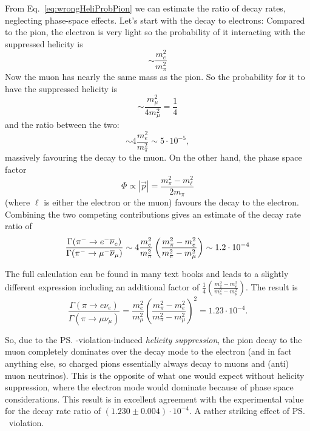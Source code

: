  From Eq.~\ref{eq:wrongHeliProbPion} we can estimate the ratio of
 decay rates, neglecting phase-space effects. Let's start with the
 decay to electrons: Compared to the pion, the electron is very 
 light so the probability of it interacting with the suppressed
 helicity is
\begin{equation}
 \sim \frac{m_e^2}{m_{\pi}^2}
\end{equation}
 Now the muon has nearly the same mass as the pion. So
 the probability for it to have the suppressed helicity is
\begin{equation}
 \sim \frac{m_{\mu}^2}{4 m_{\mu}^2} = \frac{1}{4}
\end{equation}
 and the ratio between the two:
\begin{equation}
 \sim 4\frac{m_e^2}{m_{\pi}^2} \sim 5\cdot 10^{-5},
\end{equation}
 massively favouring the decay to the muon.
 On the other hand, the phase space factor
 \begin{equation}
 \Phi \propto |\vec{p}| = 
 \frac{m^2_{\pi} - m^2_{\ell}}{2 m_{\pi}}
 \end{equation}
(where $\ell$ is either the electron or the muon) favours the decay to the electron. Combining the two competing contributions gives an estimate of the decay rate ratio of
 \begin{equation}
 \frac{\Gamma({\rm \pi^-} \to e^- \overline{\nu}_e)}{
    \Gamma({\rm \pi^-} \to \mu^- \overline{\nu}_{\mu})}
\sim
 4\frac{m_e^2}{m_{\pi}^2} 
    \left(
     \frac{m^2_{\pi} - m^2_{e}}{
     m^2_{\pi} - m^2_{\mu}}
    \right)
 \sim 1.2\cdot 10^{-4}
\end{equation}


 The full calculation can be found in many text
 books and leads to a slightly different expression
 including an additional factor of 
 $\frac{1}{4}\left(
     \frac{m^2_{\pi} - m^2_{e}}{
     m^2_{\pi} - m^2_{\mu}}
    \right)$. 
The result is
\begin{equation}
 \frac{\Gamma(\pi \to e \nu_e)}{\Gamma(\pi \to \mu \nu_{\mu})}
=
\frac{m_e^2}{m_{\mu}^2} \left(\frac{m^2_{\pi} - m^2_{e}}{m^2_{\pi} -
  m^2_{\mu}}\right)^2
= 1.23 \cdot 10^{-4}.
\end{equation}

So, due to the \ps-violation-induced \emph{helicity suppression}, the pion decay to the muon completely dominates over the decay mode to the electron (and in fact anything else, so charged pions essentially always decay to muons and (anti) muon neutrinos). This is the opposite of what one would expect without helicity suppression, where the electron mode would dominate because of phase space considerations. This result is in excellent agreement with the experimental value for the decay rate ratio of $(1.230\pm 0.004) \cdot
 10^{-4}$. 
A rather striking effect of \ps\ violation.

